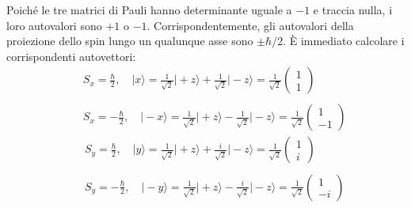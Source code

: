 Poiché le tre matrici di Pauli hanno determinante uguale a $-1$ e traccia nulla, i loro autovalori sono $+1$ o $-1$. Corrispondentemente, gli autovalori della proiezione dello spin lungo un qualunque asse sono $\pm \hbar/2$. È immediato calcolare i corrispondenti autovettori:
\begin{eqnarray}
\label{eq:cap4_4}
& &\displaystyle{S_x = \frac{\hbar}{2}, \quad \vert x \rangle = \frac{1}{\sqrt{2}}\vert +z \rangle + \frac{1}{\sqrt{2}}\vert -z \rangle}= \frac{1}{\sqrt{2}}
\begin{pmatrix}
1\\
1
\end{pmatrix} \nonumber \\
\\
& &\displaystyle{S_x = -\frac{\hbar}{2}, \quad \vert -x \rangle = \frac{1}{\sqrt{2}}\vert +z \rangle - \frac{1}{\sqrt{2}}\vert -z \rangle}= \frac{1}{\sqrt{2}} \begin{pmatrix}
1\\
-1
\end{pmatrix}\nonumber
\end{eqnarray}
\begin{eqnarray}
\label{eq:cap4_5}
& &\displaystyle{S_y = \frac{\hbar}{2}, \quad \vert y \rangle = \frac{1}{\sqrt{2}}\vert +z \rangle + \frac{i}{\sqrt{2}}\vert -z \rangle}= \frac{1}{\sqrt{2}} 
\begin{pmatrix}
1\\
i
\end{pmatrix} \nonumber \\
\\
& &\displaystyle{S_y = -\frac{\hbar}{2}, \quad \vert -y \rangle = \frac{1}{\sqrt{2}}\vert +z \rangle - \frac{i}{\sqrt{2}}\vert -z \rangle}= \frac{1}{\sqrt{2}} 
\begin{pmatrix}
1\\
-i
\end{pmatrix}\nonumber
\end{eqnarray}
